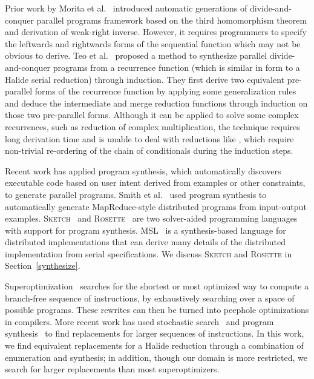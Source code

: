 Prior work by Morita et al.~\cite{Morita:2007:AIG:1250734.1250752} introduced automatic generations of divide-and-conquer parallel programs framework based on the third homomorphism theorem and derivation of weak-right inverse. However, it requires programmers to specify the leftwards and rightwards forms of the sequential function which may not be obvious to derive. Teo et al.~\cite{Teo:1997:DEP:266670.266697} proposed a method to synthesize parallel divide-and-conquer
programs from a recurrence function (which is similar in form to a Halide serial reduction) through induction. They first derive two equivalent pre-parallel forms of the recurrence function by applying some generalization rules and deduce the intermediate and merge reduction functions through induction on those two pre-parallel forms. Although it can be applied to solve some complex recurrences, such as reduction of complex multiplication, the technique requires long derivation time and is unable to deal with reductions like , which require non-trivial re-ordering of the chain of conditionals during the induction steps. 

Recent work has applied program synthesis, which automatically discovers executable code based on user intent derived from examples or other constraints, to generate parallel programs. Smith et al.~\cite{Smith:2016:MPS:2908080.2908102} used program synthesis to automatically generate MapReduce-style distributed programs from input-output examples. \textsc{Sketch}~\cite{Solar-Lezama:2008:PSS:1714168} and \textsc{Rosette}~\cite{Torlak:2013:GSL:2509578.2509586} are two solver-aided programming languages with support for program synthesis.  MSL~\cite{Xu:2014:MSE:2683593.2683628} is a synthesis-based language for distributed implementations that can derive many details of the distributed implementation from serial specifications.  We discuss \textsc{Sketch} and \textsc{Rosette} in Section~\ref{synthesize}.

Superoptimization~\cite{Granlund:1992:EBU:143095.143146, Massalin:1987:SLS:36206.36194} searches for the shortest or most optimized way to compute a branch-free sequence of instructions, by exhaustively searching over a space of possible programs. These rewrites can then be turned into peephole optimizations in compilers. More recent work has used stochastic search~\cite{Phothilimthana:2016:SUS:2872362.2872387, Schkufza:2013:SS:2490301.2451150} and program synthesis~\cite{Lopes:2015:PCP:2737924.2737965} to find replacements for larger sequences of instructions.
In this work, we find equivalent replacements for a Halide reduction through a combination of enumeration and synthesis; in addition, though our domain is more restricted, we search for larger replacements than most superoptimizers.

